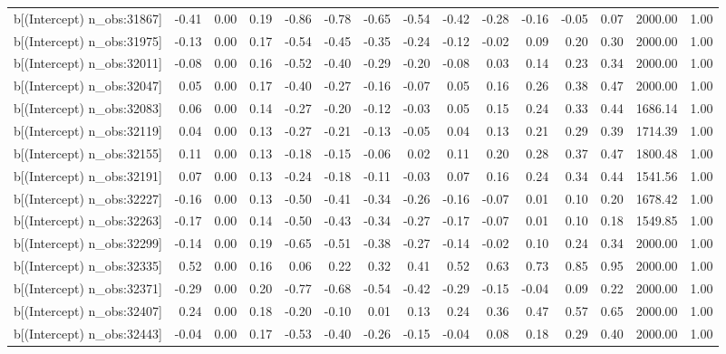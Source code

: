 \begin{table}[ht]
\begin{tabular}{rrrrrrrrrrrrrrr}
  b[(Intercept) n\_obs:31867] & -0.41 & 0.00 & 0.19 & -0.86 & -0.78 & -0.65 & -0.54 & -0.42 & -0.28 & -0.16 & -0.05 & 0.07 & 2000.00 & 1.00 \\ 
  b[(Intercept) n\_obs:31975] & -0.13 & 0.00 & 0.17 & -0.54 & -0.45 & -0.35 & -0.24 & -0.12 & -0.02 & 0.09 & 0.20 & 0.30 & 2000.00 & 1.00 \\ 
  b[(Intercept) n\_obs:32011] & -0.08 & 0.00 & 0.16 & -0.52 & -0.40 & -0.29 & -0.20 & -0.08 & 0.03 & 0.14 & 0.23 & 0.34 & 2000.00 & 1.00 \\ 
  b[(Intercept) n\_obs:32047] & 0.05 & 0.00 & 0.17 & -0.40 & -0.27 & -0.16 & -0.07 & 0.05 & 0.16 & 0.26 & 0.38 & 0.47 & 2000.00 & 1.00 \\ 
  b[(Intercept) n\_obs:32083] & 0.06 & 0.00 & 0.14 & -0.27 & -0.20 & -0.12 & -0.03 & 0.05 & 0.15 & 0.24 & 0.33 & 0.44 & 1686.14 & 1.00 \\ 
  b[(Intercept) n\_obs:32119] & 0.04 & 0.00 & 0.13 & -0.27 & -0.21 & -0.13 & -0.05 & 0.04 & 0.13 & 0.21 & 0.29 & 0.39 & 1714.39 & 1.00 \\ 
  b[(Intercept) n\_obs:32155] & 0.11 & 0.00 & 0.13 & -0.18 & -0.15 & -0.06 & 0.02 & 0.11 & 0.20 & 0.28 & 0.37 & 0.47 & 1800.48 & 1.00 \\ 
  b[(Intercept) n\_obs:32191] & 0.07 & 0.00 & 0.13 & -0.24 & -0.18 & -0.11 & -0.03 & 0.07 & 0.16 & 0.24 & 0.34 & 0.44 & 1541.56 & 1.00 \\ 
  b[(Intercept) n\_obs:32227] & -0.16 & 0.00 & 0.13 & -0.50 & -0.41 & -0.34 & -0.26 & -0.16 & -0.07 & 0.01 & 0.10 & 0.20 & 1678.42 & 1.00 \\ 
  b[(Intercept) n\_obs:32263] & -0.17 & 0.00 & 0.14 & -0.50 & -0.43 & -0.34 & -0.27 & -0.17 & -0.07 & 0.01 & 0.10 & 0.18 & 1549.85 & 1.00 \\ 
  b[(Intercept) n\_obs:32299] & -0.14 & 0.00 & 0.19 & -0.65 & -0.51 & -0.38 & -0.27 & -0.14 & -0.02 & 0.10 & 0.24 & 0.34 & 2000.00 & 1.00 \\ 
  b[(Intercept) n\_obs:32335] & 0.52 & 0.00 & 0.16 & 0.06 & 0.22 & 0.32 & 0.41 & 0.52 & 0.63 & 0.73 & 0.85 & 0.95 & 2000.00 & 1.00 \\ 
  b[(Intercept) n\_obs:32371] & -0.29 & 0.00 & 0.20 & -0.77 & -0.68 & -0.54 & -0.42 & -0.29 & -0.15 & -0.04 & 0.09 & 0.22 & 2000.00 & 1.00 \\ 
  b[(Intercept) n\_obs:32407] & 0.24 & 0.00 & 0.18 & -0.20 & -0.10 & 0.01 & 0.13 & 0.24 & 0.36 & 0.47 & 0.57 & 0.65 & 2000.00 & 1.00 \\ 
  b[(Intercept) n\_obs:32443] & -0.04 & 0.00 & 0.17 & -0.53 & -0.40 & -0.26 & -0.15 & -0.04 & 0.08 & 0.18 & 0.29 & 0.40 & 2000.00 & 1.00 \\ 

\end{tabular}
\end{table}
